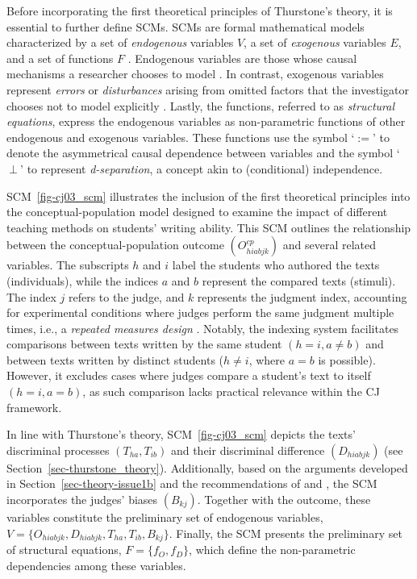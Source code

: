 \documentclass[
  authoryear,
  review,
  1p]{elsarticle}
\begin{document}
Before incorporating the first theoretical principles of Thurstone's
theory, it is essential to further define SCMs. SCMs are formal
mathematical models characterized by a set of \emph{endogenous}
variables \(V\), a set of \emph{exogenous} variables \(E\), and a set of
functions \(F\) \citep{Pearl_2009, Cinelli_et_al_2020}. Endogenous
variables are those whose causal mechanisms a researcher chooses to
model \citep{Neal_2020}. In contrast, exogenous variables represent
\emph{errors} or \emph{disturbances} arising from omitted factors that
the investigator chooses not to model explicitly
\citep[pp.~27,68]{Pearl_2009}. Lastly, the functions, referred to as
\emph{structural equations}, express the endogenous variables as
non-parametric functions of other endogenous and exogenous variables.
These functions use the symbol `\(:=\)' to denote the asymmetrical
causal dependence between variables and the symbol `\(\:\bot\:\)' to
represent \emph{d-separation}, a concept akin to (conditional)
independence.

SCM~\ref{fig-cj03_scm} illustrates the inclusion of the first
theoretical principles into the conceptual-population model designed to
examine the impact of different teaching methods on students' writing
ability. This SCM outlines the relationship between the
conceptual-population outcome \((O^{cp}_{hiabjk})\) and several related
variables. The subscripts \(h\) and \(i\) label the students who
authored the texts (individuals), while the indices \(a\) and \(b\)
represent the compared texts (stimuli). The index \(j\) refers to the
judge, and \(k\) represents the judgment index, accounting for
experimental conditions where judges perform the same judgment multiple
times, i.e., a \emph{repeated measures design}
\citep[pp.~366-376]{Lawson_2015}. Notably, the indexing system
facilitates comparisons between texts written by the same student
\((h = i, a \neq b)\) and between texts written by distinct students
(\(h \neq i\), where \(a = b\) is possible). However, it excludes cases
where judges compare a student's text to itself \((h = i, a = b)\), as
such comparison lacks practical relevance within the CJ framework.

In line with Thurstone's theory, SCM~\ref{fig-cj03_scm} depicts the
texts' discriminal processes \((T_{ha}, T_{ib})\) and their discriminal
difference \((D_{hiabjk})\) (see Section~\ref{sec-thurstone_theory}).
Additionally, based on the arguments developed in
Section~\ref{sec-theory-issue1b} and the recommendations of
\citet{Andrich_1978} and \citet{Wainer_et_al_1978}, the SCM incorporates
the judges' biases \((B_{kj})\). Together with the outcome, these
variables constitute the preliminary set of endogenous variables,
\(V = \{ O_{hiabjk}, D_{hiabjk}, T_{ha}, T_{ib}, B_{kj} \}\). Finally,
the SCM presents the preliminary set of structural equations,
\(F = \{ f_{O}, f_{D} \}\), which define the non-parametric dependencies
among these variables.
\end{document}
